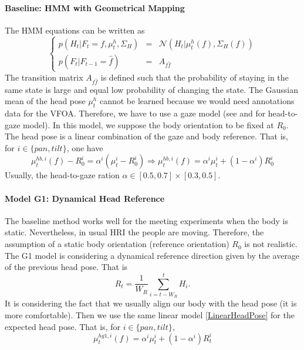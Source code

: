 \documentclass[11pt,a4paper]{article}
\begin{document}
\paragraph{Baseline: HMM with Geometrical Mapping}
The HMM equations can be written as
\begin{equation}
\left\{
\begin{array}{rcl}
p(H_t | F_t = f,\mu_t^h,\Sigma_H) &=& \mathcal{N}(H_t|\mu_t^h(f),\Sigma_H(f)) \\
p(F_t | F_{t-1} = \hat{f}) &=& A_{f\hat{f}} 
\end{array}
\right.
\end{equation}
The transition matrix $A_{f\hat{f}}$ is defined such that the probability of staying in the same state is large and equal low probability of changing the state. The Gaussian mean of the head pose $\mu_t^h$ cannot be learned because we would need annotations data for the VFOA. Therefore, we have to use a gaze model (see \cite{Langton2000} and \cite{HanesMcCollum2006} for head-to-gaze model). In this model, we suppose the body orientation to be fixed at $R_0$. The head pose is a linear combination of the gaze and body reference. That is, for $i \in \{pan, tilt\}$, one have
\begin{equation}
\label{LinearHeadPose}
\mu_t^{hb,i}(f)-R_0^i = \alpha^i(\mu_t^i - R_0^i) \Rightarrow \mu_t^{hb,i}(f)= \alpha^i \mu_t^i +(1-\alpha^i)R_0^i 
\end{equation}
Usually, the head-to-gaze ration $\alpha \in [0.5,0.7] \times [0.3,0.5]$.

\paragraph{Model G1: Dynamical Head Reference}
The baseline method works well for the meeting experiments when the body is static. Nevertheless, in usual HRI the people are moving. Therefore, the assumption of a static body orientation (reference orientation) $R_0$ is not realistic. The G1 model is considering a dynamical reference direction given by the average of the previous head pose. That is
\begin{equation}
R_t = \frac{1}{W_R} \sum_{i=t-W_R}^{t} H_i.
\end{equation}
It is considering the fact that we usually align our body with the head pose (it is more comfortable). Then we use the same linear model \eqref{LinearHeadPose} for the expected head pose. That is, for $i \in \{pan, tilt\}$, 
\begin{equation}
\mu_t^{hg1,i}(f)= \alpha^i \mu_t^i +(1-\alpha^i)R_t^i 
\end{equation}
\end{document}
